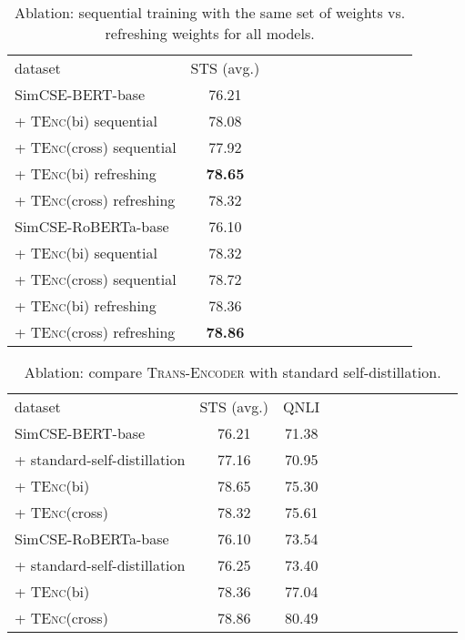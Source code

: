 \documentclass{article} \usepackage{iclr2021_conference,times}
\newcommand{\modelname}{\textsc{Trans-Encoder}\xspace}
\newcommand{\tenc}{\textsc{TEnc}\xspace}
\begin{document}
\begin{table}[!t] \setlength{\tabcolsep}{3.6pt}
\centering
\begin{tabular}{lccccccccccc}
\cmidrule[1.5pt]{1-10}
 dataset  & STS (avg.)\\
\cmidrule[1.0pt]{1-10}
 SimCSE-BERT-base & 76.21    \\
 + \tenc (bi) sequential &  78.08  \\
 + \tenc (cross) sequential &  77.92  \\
 + \tenc (bi) refreshing &  \textbf{78.65}  \\
 + \tenc (cross) refreshing & 78.32 \\
  \cmidrule[.5pt]{1-10}
  SimCSE-RoBERTa-base & 76.10  \\
  + \tenc (bi) sequential &   78.32 \\
  + \tenc (cross) sequential &  78.72  \\
  + \tenc (bi) refreshing &  78.36 \\
  + \tenc (cross) refreshing  & \textbf{78.86} \\
  \cmidrule[1.5pt]{1-10}
\end{tabular}
\caption{Ablation: sequential training with the same set of weights vs. refreshing weights for all models.}
\label{tab:sequential}
\end{table}

\begin{table}[!t] \setlength{\tabcolsep}{3.6pt}
\centering
\begin{tabular}{lccccccccccc}
\cmidrule[1.5pt]{1-10}
dataset  & STS (avg.) & QNLI & \\
\cmidrule[1.0pt]{1-10}
 SimCSE-BERT-base & 76.21 & 71.38  \\
  + standard-self-distillation & 77.16 & 70.95  \\
 + \tenc (bi) & 78.65 & 75.30 \\
  + \tenc (cross) & 78.32 & 75.61   \\
  \cmidrule[.5pt]{1-10}
SimCSE-RoBERTa-base & 76.10 & 73.54   \\
  + standard-self-distillation & 76.25 & 73.40\\
 + \tenc (bi) & 78.36 & 77.04\\
  + \tenc (cross) &  78.86 & 80.49 \\
  \cmidrule[1.5pt]{1-10}
\end{tabular}
\caption{Ablation: compare \modelname with standard self-distillation.}
\label{tab:standard_self_distil}
\end{table}
\end{document}
